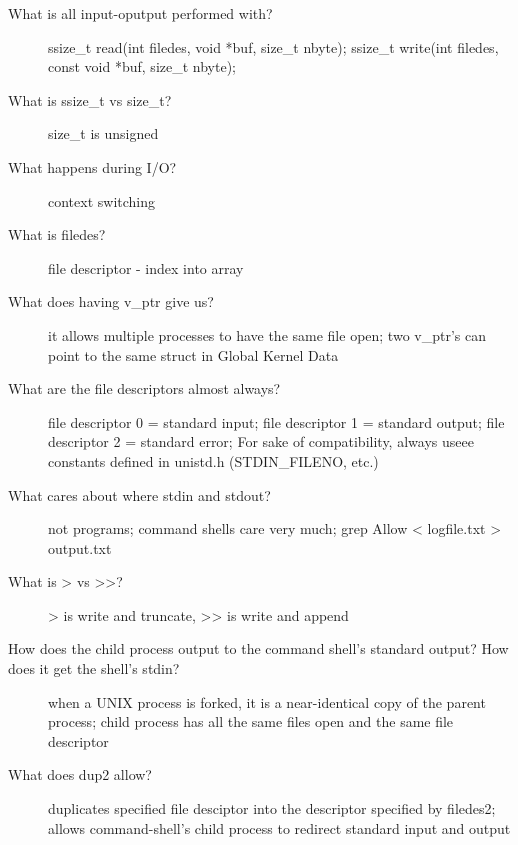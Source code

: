 \documentclass[10pt]{article}
\begin{document}
\begin{description}
\item[What is all input-oputput performed with?]
  ssize\_t read(int filedes, void *buf, size\_t nbyte);
  ssize\_t write(int filedes, const void *buf, size\_t nbyte);
\item[What is ssize\_t vs size\_t?]
  size\_t is unsigned
\item[What happens during I/O?]
  context switching
\item[What is filedes?]
  file descriptor - index into array
\item[What does having v\_ptr give us?]
  it allows multiple processes to have the same file open;
  two v\_ptr's can point to the same struct in Global Kernel Data
\item[What are the file descriptors almost always?]
  file descriptor 0 = standard input;
  file descriptor 1 = standard output;
  file descriptor 2 = standard error;
  For sake of compatibility, always useee constants defined in unistd.h (STDIN\_FILENO, etc.)
\item[What cares about where stdin and stdout?]
  not programs;
  command shells care very much;
  grep Allow < logfile.txt > output.txt
\item[What is > vs >>?]
  > is write and truncate, >> is write and append
\item[How does the child process output to the command shell's standard output? How does it get the shell's stdin?]
  when a UNIX process is forked, it is a near-identical copy of the parent process;
  child process has all the same files open and the same file descriptor
\item[What does dup2 allow?]
  duplicates specified file desciptor into the descriptor specified by filedes2;
  allows command-shell's child process to redirect standard input and output
\end{description}
\end{document}
